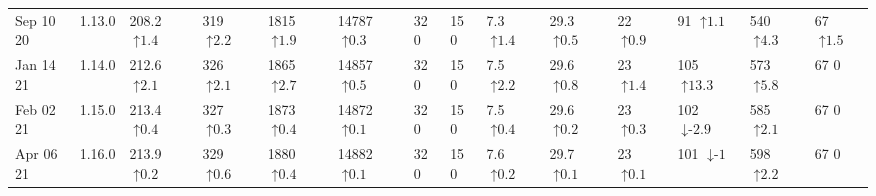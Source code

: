 \begin{tabular}{ll|llllll|lll|lll}
Sep 10 20 & 1.13.0 & 208.2 {\tiny $\uparrow\text{1.4}$} & 319 {\tiny $\uparrow\text{2.2}$} & 1815 {\tiny $\uparrow\text{1.9}$} & 14787 {\tiny $\uparrow\text{0.3}$} & 32 {\tiny $\text{0}$} & 15 {\tiny $\text{0}$} & 7.3 {\tiny $\uparrow\text{1.4}$} & 29.3 {\tiny $\uparrow\text{0.5}$} & 22 {\tiny $\uparrow\text{0.9}$} & 91 {\tiny $\uparrow\text{1.1}$} & 540 {\tiny $\uparrow\text{4.3}$} & 67 {\tiny $\uparrow\text{1.5}$} \\
Jan 14 21 & 1.14.0 & 212.6 {\tiny $\uparrow\text{2.1}$} & 326 {\tiny $\uparrow\text{2.1}$} & 1865 {\tiny $\uparrow\text{2.7}$} & 14857 {\tiny $\uparrow\text{0.5}$} & 32 {\tiny $\text{0}$} & 15 {\tiny $\text{0}$} & 7.5 {\tiny $\uparrow\text{2.2}$} & 29.6 {\tiny $\uparrow\text{0.8}$} & 23 {\tiny $\uparrow\text{1.4}$} & 105 {\tiny $\uparrow\text{13.3}$} & 573 {\tiny $\uparrow\text{5.8}$} & 67 {\tiny $\text{0}$} \\
Feb 02 21 & 1.15.0 & 213.4 {\tiny $\uparrow\text{0.4}$} & 327 {\tiny $\uparrow\text{0.3}$} & 1873 {\tiny $\uparrow\text{0.4}$} & 14872 {\tiny $\uparrow\text{0.1}$} & 32 {\tiny $\text{0}$} & 15 {\tiny $\text{0}$} & 7.5 {\tiny $\uparrow\text{0.4}$} & 29.6 {\tiny $\uparrow\text{0.2}$} & 23 {\tiny $\uparrow\text{0.3}$} & 102 {\tiny $\downarrow\text{-}\text{2.9}$} & 585 {\tiny $\uparrow\text{2.1}$} & 67 {\tiny $\text{0}$} \\
Apr 06 21 & 1.16.0 & 213.9 {\tiny $\uparrow\text{0.2}$} & 329 {\tiny $\uparrow\text{0.6}$} & 1880 {\tiny $\uparrow\text{0.4}$} & 14882 {\tiny $\uparrow\text{0.1}$} & 32 {\tiny $\text{0}$} & 15 {\tiny $\text{0}$} & 7.6 {\tiny $\uparrow\text{0.2}$} & 29.7 {\tiny $\uparrow\text{0.1}$} & 23 {\tiny $\uparrow\text{0.1}$} & 101 {\tiny $\downarrow\text{-}\text{1}$} & 598 {\tiny $\uparrow\text{2.2}$} & 67 {\tiny $\text{0}$} \\
\bottomrule
\end{tabular}
\label{tab:deps_gaf}